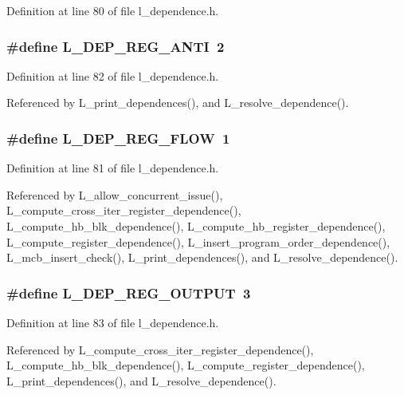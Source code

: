 Definition at line 80 of file l\_\-dependence.h.
\subsubsection{\setlength{\rightskip}{0pt plus 5cm}\#define L\_\-DEP\_\-REG\_\-ANTI~2}\label{l__dependence_8h_7d009edbac1dc5b067b5f5eedeb0b423}




Definition at line 82 of file l\_\-dependence.h.

Referenced by L\_\-print\_\-dependences(), and L\_\-resolve\_\-dependence().
\subsubsection{\setlength{\rightskip}{0pt plus 5cm}\#define L\_\-DEP\_\-REG\_\-FLOW~1}\label{l__dependence_8h_7e5a0511f265decccf9c5ec21bdea4b8}




Definition at line 81 of file l\_\-dependence.h.

Referenced by L\_\-allow\_\-concurrent\_\-issue(), L\_\-compute\_\-cross\_\-iter\_\-register\_\-dependence(), L\_\-compute\_\-hb\_\-blk\_\-dependence(), L\_\-compute\_\-hb\_\-register\_\-dependence(), L\_\-compute\_\-register\_\-dependence(), L\_\-insert\_\-program\_\-order\_\-dependence(), L\_\-mcb\_\-insert\_\-check(), L\_\-print\_\-dependences(), and L\_\-resolve\_\-dependence().
\subsubsection{\setlength{\rightskip}{0pt plus 5cm}\#define L\_\-DEP\_\-REG\_\-OUTPUT~3}\label{l__dependence_8h_d0f48f8141b45ad238c6907fdd065592}




Definition at line 83 of file l\_\-dependence.h.

Referenced by L\_\-compute\_\-cross\_\-iter\_\-register\_\-dependence(), L\_\-compute\_\-hb\_\-blk\_\-dependence(), L\_\-compute\_\-register\_\-dependence(), L\_\-print\_\-dependences(), and L\_\-resolve\_\-dependence().
